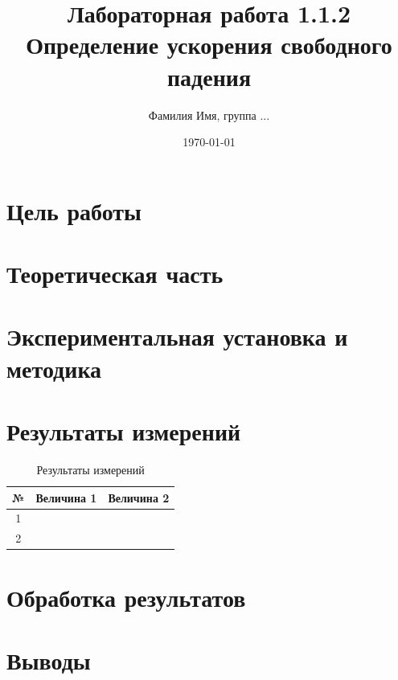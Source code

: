 \documentclass[12pt]{article}
\title{Лабораторная работа 1.1.2 \\ Определение ускорения свободного падения}
\author{Фамилия Имя, группа ...}
\date{\today}
\begin{document}
\maketitle

\section{Цель работы}

\section{Теоретическая часть}

\section{Экспериментальная установка и методика}

\section{Результаты измерений}

\begin{table}[h]
    \centering
    \caption{Результаты измерений}
    \begin{tabular}{ccc}
        \toprule
        № & Величина 1 & Величина 2 \\
        \midrule
        1 & & \\
        2 & & \\
        \bottomrule
    \end{tabular}
\end{table}

\section{Обработка результатов}

\section{Выводы}
\end{document}
